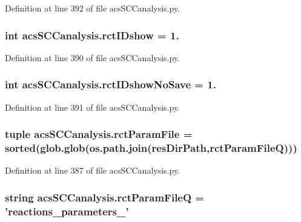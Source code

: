 Definition at line 392 of file acs\-S\-C\-Canalysis.\-py.

\hypertarget{a00097_a8a780c7762bc8a40f296abfd474b7ce4}{
\subsubsection[{rct\-I\-Dshow}]{\setlength{\rightskip}{0pt plus 5cm}int acs\-S\-C\-Canalysis.\-rct\-I\-Dshow = 1.}}\label{a00097_a8a780c7762bc8a40f296abfd474b7ce4}


Definition at line 390 of file acs\-S\-C\-Canalysis.\-py.

\hypertarget{a00097_a3942b0b71d5893c244f7f49929db336b}{
\subsubsection[{rct\-I\-Dshow\-No\-Save}]{\setlength{\rightskip}{0pt plus 5cm}int acs\-S\-C\-Canalysis.\-rct\-I\-Dshow\-No\-Save = 1.}}\label{a00097_a3942b0b71d5893c244f7f49929db336b}


Definition at line 391 of file acs\-S\-C\-Canalysis.\-py.

\hypertarget{a00097_ac700504fc38d7684ec9fae104d7d90a3}{
\subsubsection[{rct\-Param\-File}]{\setlength{\rightskip}{0pt plus 5cm}tuple acs\-S\-C\-Canalysis.\-rct\-Param\-File = sorted(glob.\-glob(os.\-path.\-join({\bf res\-Dir\-Path},{\bf rct\-Param\-File\-Q})))}}\label{a00097_ac700504fc38d7684ec9fae104d7d90a3}


Definition at line 387 of file acs\-S\-C\-Canalysis.\-py.

\hypertarget{a00097_aff5ea475bb2c78122a231a915dc88e89}{
\subsubsection[{rct\-Param\-File\-Q}]{\setlength{\rightskip}{0pt plus 5cm}string acs\-S\-C\-Canalysis.\-rct\-Param\-File\-Q = 'reactions\-\_\-parameters\-\_\-'}}\label{a00097_aff5ea475bb2c78122a231a915dc88e89}


